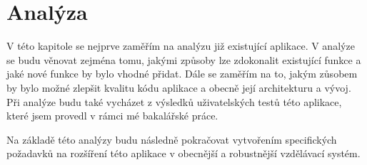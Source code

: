 \chapter{Analýza}

V této kapitole se nejprve zaměřím na analýzu již existující aplikace. V analýze se budu věnovat zejména tomu, jakými způsoby lze zdokonalit existující funkce a jaké nové funkce by bylo vhodné přidat. Dále se zaměřím na to, jakým zůsobem by bylo možné zlepšit kvalitu kódu aplikace a obecně její architekturu a vývoj. Při analýze budu také vycházet z výsledků uživatelských testů této aplikace, které jsem provedl v rámci mé bakalářské práce. %


Na základě této analýzy budu následně pokračovat vytvořením specifických požadavků na rozšíření této aplikace v obecnější a robustnější vzdělávací systém.

